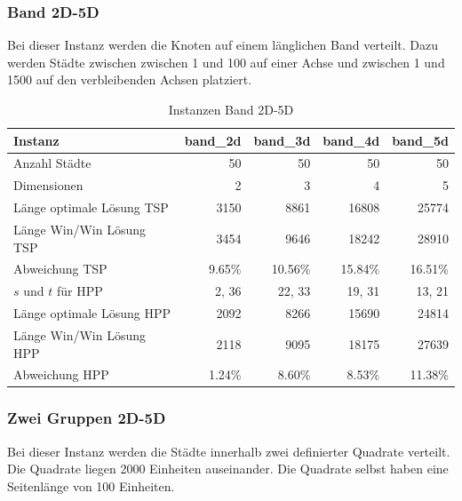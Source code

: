 \documentclass[11pt,a4paper]{article}
\begin{document}
\subsubsection{Band 2D-5D}
Bei dieser Instanz werden die Knoten auf einem länglichen Band verteilt. Dazu werden Städte zwischen zwischen 1 und 100 auf einer Achse und zwischen 1 und 1500 auf den verbleibenden Achsen platziert.

\begin{table}[H]
        \centering
        \begin{tabular}{| l | r | r | r | r |}
            \hline
            Instanz                     & \textbf{band\_2d}     
                                        & \textbf{band\_3d}     
                                        & \textbf{band\_4d}     
                                        & \textbf{band\_5d}             \\ \hline
                Anzahl Städte               & 50        & 50       & 50         & 50        \\ \hline
                Dimensionen                 & 2         & 3        & 4          & 5         \\ \hline
                Länge optimale Lösung TSP   & 3150      & 8861     & 16808      & 25774     \\ \hline
                Länge Win/Win Lösung  TSP   & 3454      & 9646     & 18242      & 28910     \\ \hline
                Abweichung TSP              & 9.65\%    & 10.56\%  & 15.84\%    & 16.51\%   \\ \hline
                $s$ und $t$ für HPP         & 2, 36     & 22, 33   & 19, 31     & 13, 21    \\ \hline
                Länge optimale Lösung HPP   & 2092      & 8266     & 15690      & 24814     \\ \hline
                Länge Win/Win Lösung  HPP   & 2118      & 9095     & 18175      & 27639     \\ \hline
                Abweichung HPP              & 1.24\%    & 8.60\%   & 8.53\%     & 11.38\%   \\ \hline
        \end{tabular}
        \caption{Instanzen Band 2D-5D}
        \label{tab:instanzen_belt}
\end{table}

\subsubsection{Zwei Gruppen 2D-5D}
Bei dieser Instanz werden die Städte innerhalb zwei definierter Quadrate verteilt. Die Quadrate liegen 2000 Einheiten auseinander. Die Quadrate selbst haben eine Seitenlänge von 100 Einheiten.
\end{document}
